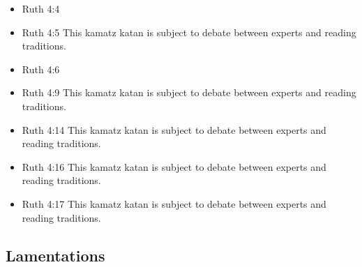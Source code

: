 \documentclass[14pt]{article}
\begin{document}
\begin{multicols}{2}
\begin{itemize}
	\item Ruth 4:4
	
	\item Ruth 4:5 This kamatz katan is subject to debate between experts and reading traditions.
	
	\item Ruth 4:6
	
	\item Ruth 4:9 This kamatz katan is subject to debate between experts and reading traditions.
	
	\item Ruth 4:14 This kamatz katan is subject to debate between experts and reading traditions.
	
	\item Ruth 4:16 This kamatz katan is subject to debate between experts and reading traditions.
	
	\item Ruth 4:17 This kamatz katan is subject to debate between experts and reading traditions.
	
\end{itemize}\end{multicols}

\subsection{Lamentations}
\end{document}
